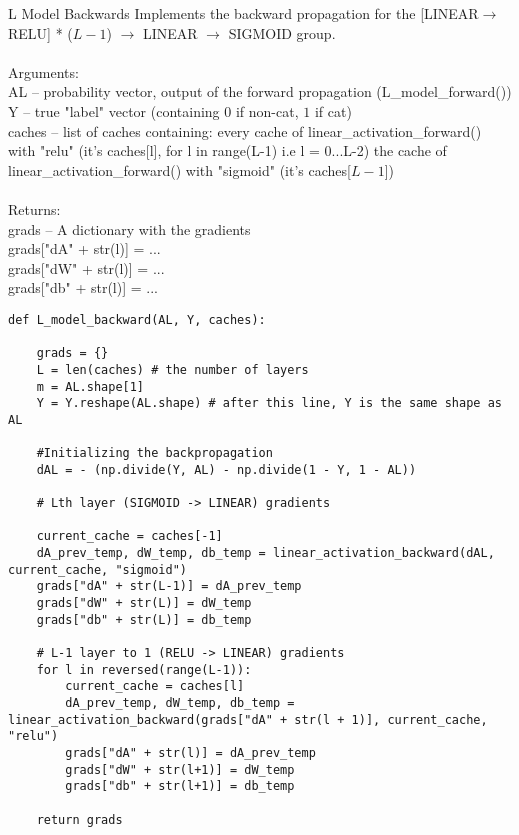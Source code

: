 \documentclass[a4paper]{article}
\begin{document}
\begin{alg}{L Model Backwards}{} Implements the backward propagation for the [LINEAR$\to$RELU] * ($L-1$) $\to$ LINEAR $\to$ SIGMOID group. \\~\\
Arguments: \\
AL -- probability vector, output of the forward propagation (L\_model\_forward())\\
Y -- true "label" vector (containing $0$ if non-cat, $1$ if cat)\\
caches -- list of caches containing: every cache of linear\_activation\_forward() with "relu" (it's caches[l], for l in range(L-1) i.e l = 0...L-2) the cache of linear\_activation\_forward() with "sigmoid" (it's caches[$L-1$])\\~\\
Returns: \\
grads -- A dictionary with the gradients\\
grads["dA" + str(l)] = ... \\
grads["dW" + str(l)] = ...\\
grads["db" + str(l)] = ... \\
\begin{verbatim}
def L_model_backward(AL, Y, caches):

    grads = {}
    L = len(caches) # the number of layers
    m = AL.shape[1]
    Y = Y.reshape(AL.shape) # after this line, Y is the same shape as AL
    
    #Initializing the backpropagation
    dAL = - (np.divide(Y, AL) - np.divide(1 - Y, 1 - AL))
    
    # Lth layer (SIGMOID -> LINEAR) gradients

    current_cache = caches[-1]
    dA_prev_temp, dW_temp, db_temp = linear_activation_backward(dAL, current_cache, "sigmoid")
    grads["dA" + str(L-1)] = dA_prev_temp
    grads["dW" + str(L)] = dW_temp
    grads["db" + str(L)] = db_temp
    
    # L-1 layer to 1 (RELU -> LINEAR) gradients
    for l in reversed(range(L-1)):
        current_cache = caches[l]
        dA_prev_temp, dW_temp, db_temp = linear_activation_backward(grads["dA" + str(l + 1)], current_cache, "relu")
        grads["dA" + str(l)] = dA_prev_temp
        grads["dW" + str(l+1)] = dW_temp
        grads["db" + str(l+1)] = db_temp

    return grads
\end{verbatim}
\end{alg}
\end{document}
